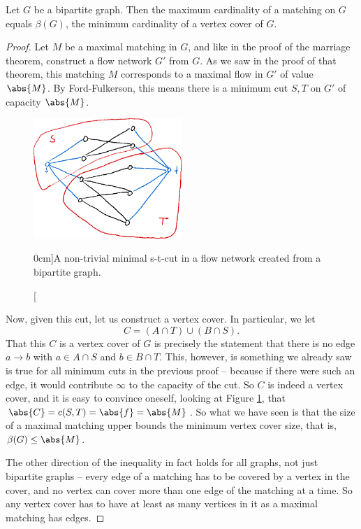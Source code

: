 \documentclass[nobib]{tufte-handout}
\begin{document}
\begin{theorem}
    Let $G$ be a bipartite graph. Then the maximum cardinality of a matching on $G$ equals $\beta(G)$, the minimum cardinality of a vertex cover of $G$.

    \begin{proof}
        Let $M$ be a maximal matching in $G$, and like in the proof of the marriage theorem, construct a flow network $G'$ from $G$. As we saw in the proof of that theorem, this matching $M$ corresponds to a maximal flow in $G'$ of value $\abs{M}$. By Ford-Fulkerson, this means there is a minimum cut $S, T$ on $G'$ of capacity $\abs{M}$.

        \begin{figure}
            \centering
            \includegraphics[width=0.5\textwidth]{graphics/L7_flows/bipartite_s_t_cut.png}
            \caption[][0cm]{A non-trivial minimal s-t-cut in a flow network created from a bipartite graph.}
            \label{fig:minimal_s_t_cut}
        \end{figure}

        Now, given this cut, let us construct a vertex cover. In particular, we let
        $$C = (A \cap T) \cup (B \cap S).$$
        That this $C$ is a vertex cover of $G$ is precisely the statement that there is no edge $a \to b$ with $a \in A \cap S$ and $b \in B \cap T$. This, however, is something we already saw is true for all minimum cuts in the previous proof -- because if there were such an edge, it would contribute $\infty$ to the capacity of the cut. So $C$ is indeed a vertex cover, and it is easy to convince oneself, looking at Figure \ref{fig:minimal_s_t_cut}, that $\abs{C} = c(S,T) = \abs{f} = \abs{M}$. So what we have seen is that the size of a maximal matching upper bounds the minimum vertex cover size, that is, $\beta(G) \leq \abs{M}$. 
        
        The other direction of the inequality in fact holds for all graphs, not just bipartite graphs -- every edge of a matching has to be covered by a vertex in the cover, and no vertex can cover more than one edge of the matching at a time. So any vertex cover has to have at least as many vertices in it as a maximal matching has edges.
    \end{proof}
\end{theorem}
\end{document}

